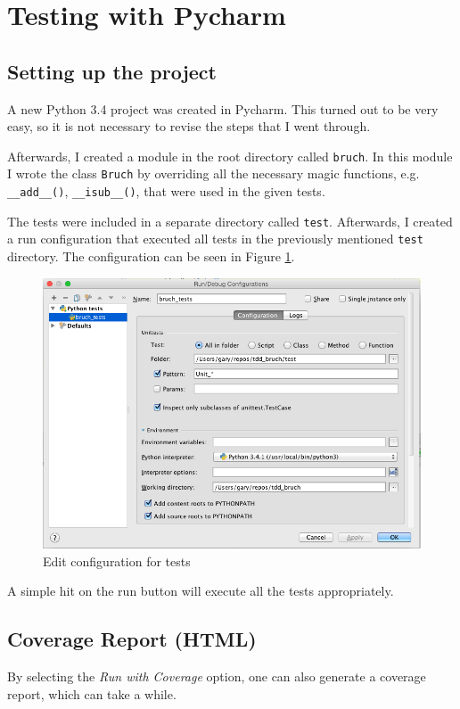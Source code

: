 \documentclass[../main/main.tex]{subfiles}
\begin{document}
\section{Testing with Pycharm} 

\subsection{Setting up the project}

A new Python 3.4 project was created in Pycharm. This turned out to be
very easy, so it is not necessary to revise the steps that I went
through. 

Afterwards, I created a module in the root directory called
\lstinline|bruch|. In this module I wrote the class \lstinline|Bruch|
by overriding all the necessary magic functions,
e.g. \lstinline|__add__()|, \lstinline|__isub__()|, that were used in
the given tests.

The tests were included in a separate directory called
\lstinline|test|. Afterwards, I created a run configuration that
executed all tests in the previously mentioned \lstinline|test|
directory. The configuration can be seen in Figure \ref{fig:edit}.

\begin{figure}[H]
  \centering
  \includegraphics[width=0.7\linewidth]{../figures/edit_config.png}
  \caption{Edit configuration for tests}
  \label{fig:edit}
\end{figure}

A simple hit on the run button will execute all the tests
appropriately.

\subsection{Coverage Report (HTML)}

By selecting the \textit{Run with Coverage} option, one
can also generate a coverage report, which can take a while. 
\end{document}
